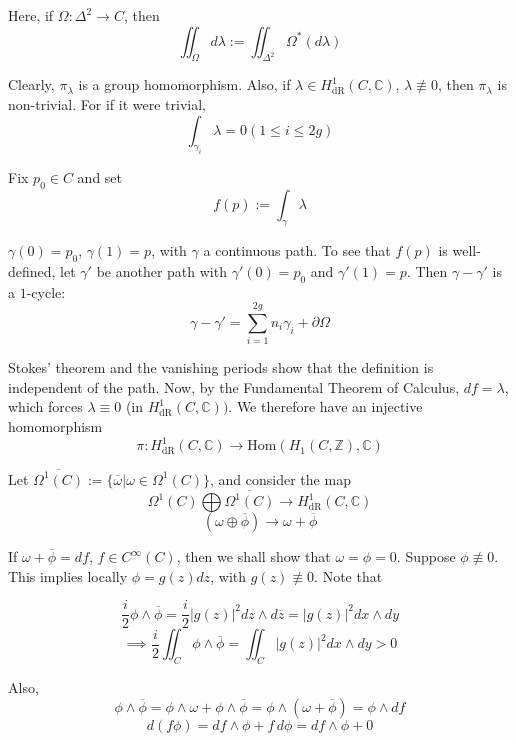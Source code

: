 \documentclass[11pt,a4paper]{article}
\begin{document}
Here, if $\Omega: \Delta^2 \rightarrow C$, then $$\iint_{\Omega}d\lambda := \iint_{\Delta^2}\Omega^*(d\lambda)$$

Clearly, $\pi_{\lambda}$ is a group homomorphism. Also, if $\lambda \in H^1_{\text{dR}}(C, \mathbb{C})$, $\lambda \not\equiv 0$, then $\pi_{\lambda}$ is non-trivial. For if it were trivial,
$$\int_{\gamma_i}\lambda = 0  (1\leq i\leq 2g)$$

Fix $p_0\in C$ and set
$$f(p):= \int_{\gamma}\lambda$$

$\gamma(0) = p_0$, $\gamma(1) = p$, with $\gamma$ a continuous path. To see that $f(p)$ is well-defined, let $\gamma'$ be another path with $\gamma'(0) = p_0$ and $\gamma'(1) = p$. Then $\gamma - \gamma'$ is a $1$-cycle:
$$\gamma - \gamma' = \sum_{i=1}^{2g}{n_i\gamma_i} + \partial \Omega$$

Stokes' theorem and the vanishing periods show that the definition is independent of the path. Now, by the Fundamental Theorem of Calculus, $df = \lambda$, which forces $\lambda \equiv 0$ (in $H^1_{\text{dR}}(C,
\mathbb{C}))$. We therefore have an injective homomorphism
$$\pi: H^1_{\text{dR}}(C, \mathbb{C}) \rightarrow \text{Hom}(H_1(C, \mathbb{Z}), \mathbb{C})$$

Let $\overline{\Omega^1(C)} := \{\overline{\omega} |  \omega\in \Omega^1(C)\}$, and consider the map
$$\Omega^1(C)\bigoplus \overline{\Omega^1(C)} \rightarrow H^1_{\text{dR}}(C, \mathbb{C})$$
$$(\omega \oplus \overline{\phi}) \rightarrow \omega + \overline{\phi}$$

If $\omega + \overline{\phi} = df$, $f\in C^{\infty}(C)$, then we shall show that $\omega = \phi = 0$. Suppose $\phi \not\equiv 0$. This implies locally $\phi = g(z)dz$, with $g(z) \not\equiv 0$. Note that

$$\frac{i}{2}\phi\wedge \overline{\phi} = \frac{i}{2}|g(z)|^2dz\wedge d\overline{z} = |g(z)|^2dx\wedge dy$$
$$\implies   \frac{i}{2}\iint_C\phi\wedge\overline{\phi} = \iint_C|g(z)|^2dx\wedge dy >0$$

Also,
$$\phi\wedge \overline{\phi} = \phi\wedge \omega + \phi\wedge \overline{\phi} = \phi\wedge(\omega+\overline{\phi}) = \phi\wedge df$$
$$d(f\phi) = df\wedge \phi + f\,d\phi = df\wedge \phi + 0$$
\end{document}
